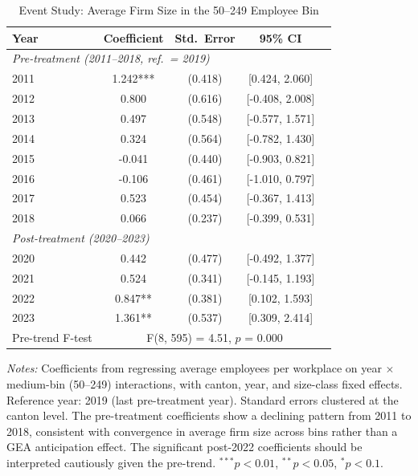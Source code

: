 \begin{table}[t]
\centering
\caption{Event Study: Average Firm Size in the 50--249 Employee Bin}
\label{tab:event_study}
\begin{threeparttable}
\begin{tabular}{l cccc}
\toprule
Year & Coefficient & Std.\ Error & 95\% CI & \\
\midrule
\multicolumn{5}{l}{\textit{Pre-treatment (2011--2018, ref.~= 2019)}} \\
2011 & 1.242*** & (0.418) & [0.424, 2.060] \\
2012 & 0.800 & (0.616) & [-0.408, 2.008] \\
2013 & 0.497 & (0.548) & [-0.577, 1.571] \\
2014 & 0.324 & (0.564) & [-0.782, 1.430] \\
2015 & -0.041 & (0.440) & [-0.903, 0.821] \\
2016 & -0.106 & (0.461) & [-1.010, 0.797] \\
2017 & 0.523 & (0.454) & [-0.367, 1.413] \\
2018 & 0.066 & (0.237) & [-0.399, 0.531] \\
\midrule
\multicolumn{5}{l}{\textit{Post-treatment (2020--2023)}} \\
2020 & 0.442 & (0.477) & [-0.492, 1.377] \\
2021 & 0.524 & (0.341) & [-0.145, 1.193] \\
2022 & 0.847** & (0.381) & [0.102, 1.593] \\
2023 & 1.361** & (0.537) & [0.309, 2.414] \\
\midrule
Pre-trend F-test & \multicolumn{4}{c}{F(8, 595) = 4.51, $p$ = 0.000} \\
\bottomrule
\end{tabular}
\begin{tablenotes}[flushleft]\footnotesize
\item \textit{Notes:} Coefficients from regressing average employees per workplace on year $\times$ medium-bin (50--249)
interactions, with canton, year, and size-class fixed effects. Reference year: 2019 (last pre-treatment year).
Standard errors clustered at the canton level. The pre-treatment coefficients show a declining pattern from 2011 to 2018,
consistent with convergence in average firm size across bins rather than a GEA anticipation effect.
The significant post-2022 coefficients should be interpreted cautiously given the pre-trend.
$^{***}p<0.01$, $^{**}p<0.05$, $^{*}p<0.1$.
\end{tablenotes}
\end{threeparttable}
\end{table}
